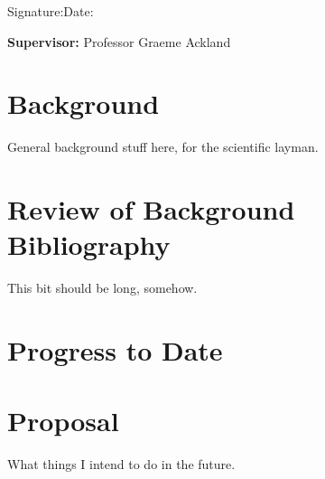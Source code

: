 \documentclass[a4paper,12pt]{article}
\begin{document}
\vspace*{1cm}

\vspace*{3cm}
Signature:\hspace*{8cm}Date:

\vfill
{\bf Supervisor:} Professor Graeme Ackland                %
\newpage
\setcounter{page}{1}                            %
\footruleheight{1pt}
\headruleheight{1pt}
\rhead{\thepage}
\cfoot{}
%
\tableofcontents                                %
\section{Background}


General background stuff here, for the scientific layman.

\section{Review of Background Bibliography}


This bit should be long, somehow.

\section{Progress to Date}


\section{Proposal}


What things I intend to do in the future.

%
%
\end{document}
